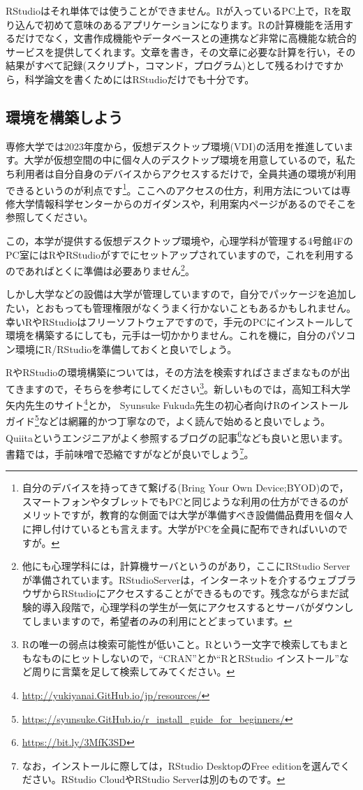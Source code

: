 \documentclass{ltjsbook}
\begin{document}
RStudioはそれ単体では使うことができません。Rが入っているPC上で，Rを取り込んで初めて意味のあるアプリケーションになります。Rの計算機能を活用するだけでなく，文書作成機能やデータベースとの連携など非常に高機能な統合的サービスを提供してくれます。文章を書き，その文章に必要な計算を行い，その結果がすべて記録(スクリプト，コマンド，プログラム)として残るわけですから，科学論文を書くためにはRStudioだけでも十分です。


\subsection{環境を構築しよう}
専修大学では2023年度から，仮想デスクトップ環境(VDI)の活用を推進しています。大学が仮想空間の中に個々人のデスクトップ環境を用意しているので，私たち利用者は自分自身のデバイスからアクセスするだけで，全員共通の環境が利用できるというのが利点です\footnote{自分のデバイスを持ってきて繋げる(Bring Your Own Device;BYOD)ので，スマートフォンやタブレットでもPCと同じような利用の仕方ができるのがメリットですが，教育的な側面では大学が準備すべき設備備品費用を個々人に押し付けているとも言えます。大学がPCを全員に配布できればいいのですが。}。ここへのアクセスの仕方，利用方法については専修大学情報科学センターからのガイダンスや，利用案内ページがあるのでそこを参照してください。

この，本学が提供する仮想デスクトップ環境や，心理学科が管理する4号館4FのPC室にはRやRStudioがすでにセットアップされていますので，これを利用するのであればとくに準備は必要ありません\footnote{他にも心理学科には，計算機サーバというのがあり，ここにRStudio Serverが準備されています。RStudioServerは，インターネットを介するウェブブラウザからRStudioにアクセスすることができるものです。残念ながらまだ試験的導入段階で，心理学科の学生が一気にアクセスするとサーバがダウンしてしまいますので，希望者のみの利用にとどまっています。}。

しかし大学などの設備は大学が管理していますので，自分でパッケージを追加したい，とおもっても管理権限がなくうまく行かないこともあるかもしれません。幸いRやRStudioはフリーソフトウェアですので，手元のPCにインストールして環境を構築するにしても，元手は一切かかりません。これを機に，自分のパソコン環境にR/RStudioを準備しておくと良いでしょう。

RやRStudioの環境構築については，その方法を検索すればさまざまなものが出てきますので，そちらを参考にしてください\footnote{Rの唯一の弱点は検索可能性が低いこと。Rという一文字で検索してもまともなものにヒットしないので，``CRAN''とか``RとRStudio インストール''など周りに言葉を足して検索してみてください。}。新しいものでは，高知工科大学矢内先生のサイト\footnote{\url{http://yukiyanai.GitHub.io/jp/resources/}}とか，
Syunsuke Fukuda先生の初心者向けRのインストールガイド\footnote{\url{https://syunsuke.GitHub.io/r_install_guide_for_beginners/}}などは網羅的かつ丁寧なので，よく読んで始めると良いでしょう。Quiitaというエンジニアがよく参照するブログの記事\footnote{\url{https://bit.ly/3MfK3SD}}なども良いと思います。書籍では，手前味噌で恐縮ですが\textcite{kosugi2019}などが良いでしょう\footnote{なお，インストールに際しては，RStudio DesktopのFree editionを選んでください。RStudio CloudやRStudio Serverは別のものです。}。
\end{document}
